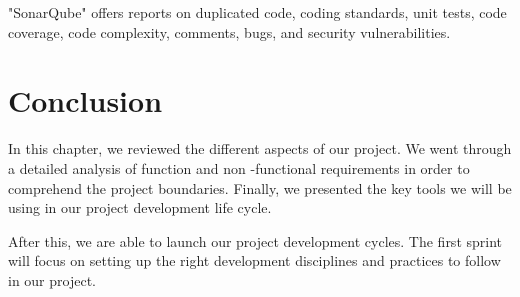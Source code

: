 \begin{spacing}{1.2}
"SonarQube" offers reports on duplicated code, coding standards, unit tests, code coverage, code complexity, comments, bugs, and security vulnerabilities.
\section*{Conclusion}
In this chapter, we reviewed the different aspects of our project. We went through a detailed analysis of function and non -functional requirements in order to comprehend the project boundaries. 
Finally, we presented the key tools we will be using in our project development life cycle.

After this, we are able to launch our project development cycles. The first sprint will focus on setting up the right development disciplines and practices to follow in our project.

\end{spacing}
